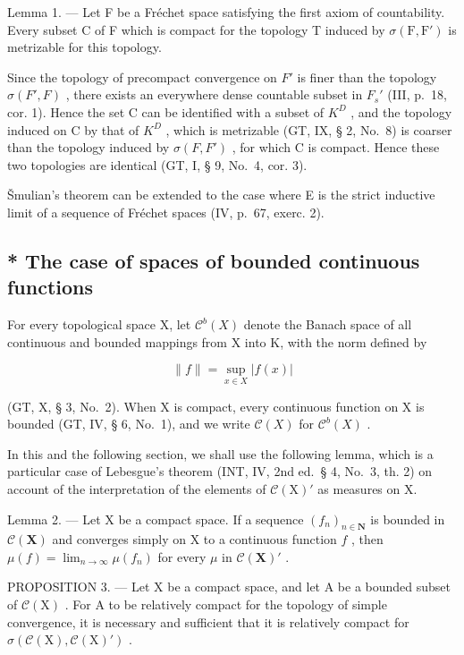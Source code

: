 Lemma 1. --- Let F be a Fréchet space satisfying the first axiom of countability. Every subset C of F which is compact for the topology T induced by \(\sigma(\mathrm{F},\mathrm{F}')\) is metrizable for this topology.

Since the topology of precompact convergence on \(F'\) is finer than the topology \(\sigma(F', F)\) , there exists an everywhere dense countable subset in \(F_{s}'\) (III, p.~18, cor. 1). Hence the set C can be identified with a subset of \(K^{D}\) , and the topology induced on C by that of \(K^{D}\) , which is metrizable (GT, IX, § 2, No.~8) is coarser than the topology induced by \(\sigma(F, F')\) , for which C is compact. Hence these two topologies are identical (GT, I, § 9, No.~4, cor. 3).

Šmulian's theorem can be extended to the case where E is the strict inductive limit of a sequence of Fréchet spaces (IV, p.~67, exerc. 2).

\subsection{* The case of spaces of bounded continuous functions}

For every topological space X, let \(\mathcal{C}^{b}(X)\) denote the Banach space of all continuous and bounded mappings from X into K, with the norm defined by

\[
\| f \| = \sup _ {x \in X} | f (x) |\tag{6}
\]

(GT, X, § 3, No.~2). When X is compact, every continuous function on X is bounded (GT, IV, § 6, No.~1), and we write \(\mathcal{C}(X)\) for \(\mathcal{C}^b(X)\) .

In this and the following section, we shall use the following lemma, which is a particular case of Lebesgue's theorem (INT, IV, 2nd ed.~§ 4, No.~3, th. 2) on account of the interpretation of the elements of \(\mathcal{C}(\mathrm{X})'\) as measures on X.

Lemma 2. --- Let X be a compact space. If a sequence \((f_n)_{n\in \mathbf{N}}\) is bounded in \(\mathcal{C}(\mathbf{X})\) and converges simply on X to a continuous function \(f\) , then \(\mu(f) = \lim_{n\to \infty}\mu(f_n)\) for every \(\mu\) in \(\mathcal{C}(\mathbf{X})'\) .

PROPOSITION 3. --- Let X be a compact space, and let A be a bounded subset of \(\mathcal{C}(\mathrm{X})\) . For A to be relatively compact for the topology of simple convergence, it is necessary and sufficient that it is relatively compact for \(\sigma(\mathcal{C}(\mathrm{X}), \mathcal{C}(\mathrm{X})')\) .

